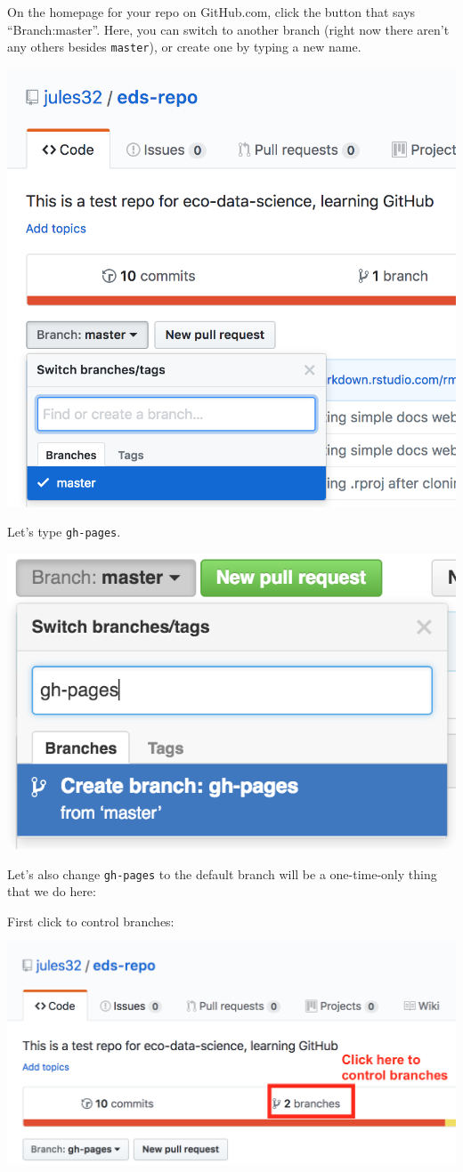 \documentclass[]{book}
\begin{document}
On the homepage for your repo on GitHub.com, click the button that says ``Branch:master''. Here, you can switch to another branch (right now there aren't any others besides \texttt{master}), or create one by typing a new name.

\includegraphics[width=0.8\linewidth]{img/github-branch}

Let's type \texttt{gh-pages}.

\includegraphics[width=0.8\linewidth]{img/github_create-branch_gh-pages}

Let's also change \texttt{gh-pages} to the default branch will be a one-time-only thing that we do here:

First click to control branches:

\includegraphics[width=0.8\linewidth]{img/github-branch2}
\end{document}
